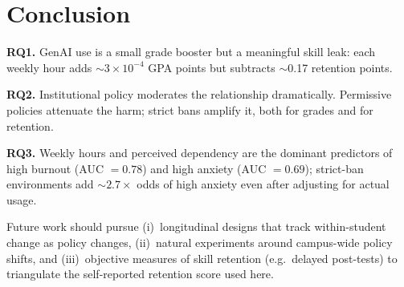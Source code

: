 \documentclass[11pt]{article}
\begin{document}
\section{Conclusion}
\label{sec:conclusion}

\textbf{RQ1.} GenAI use is a small grade booster but a meaningful skill
leak: each weekly hour adds $\sim\!3\!\times\!10^{-4}$ GPA points but
subtracts $\sim$0.17 retention points.

\textbf{RQ2.} Institutional policy moderates the relationship dramatically.
Permissive policies attenuate the harm; strict bans amplify it, both for
grades and for retention.

\textbf{RQ3.} Weekly hours and perceived dependency are the dominant
predictors of high burnout (AUC $=0.78$) and high anxiety (AUC $=0.69$);
strict-ban environments add $\sim\!2.7\times$ odds of high anxiety even
after adjusting for actual usage.

Future work should pursue (i)~longitudinal designs that track within-student
change as policy changes, (ii)~natural experiments around campus-wide policy
shifts, and (iii)~objective measures of skill retention (e.g.\ delayed
post-tests) to triangulate the self-reported retention score used here.
\end{document}
